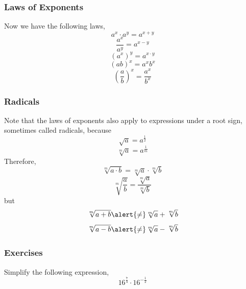 \documentclass[xcolor=dvipsnames]{beamer}
\begin{document}
\begin{frame}
  \frametitle{Laws of Exponents}
Now we have the following laws,
\begin{equation}
  \label{eq:eihietae}
  a^{x}\cdot{}a^{y}=a^{x+y}
\end{equation}
\begin{equation}
  \label{eq:eeyaidie}
  \frac{a^{x}}{a^{y}}=a^{x-y}
\end{equation}
\begin{equation}
  \label{eq:ieboonge}
  \left(a^{x}\right)^{y}=a^{x\cdot{}y}
\end{equation}
\begin{equation}
  \label{eq:oongenoh}
  (ab)^{x}=a^{x}b^{x}
\end{equation}
\begin{equation}
  \label{eq:rahsieti}
  \left(\frac{a}{b}\right)^{x}=\frac{a^{x}}{b^{x}}
\end{equation}
\end{frame}

\begin{frame}
  \frametitle{Radicals}
  Note that the laws of exponents also apply to expressions under a
  root sign, sometimes called \alert{radicals}, because
  \begin{equation}
    \label{eq:shoaphoo}
    \sqrt{a}=a^{\frac{1}{2}}
  \end{equation}
  \begin{equation}
    \label{eq:thishoof}
    \sqrt[m]{a}=a^{\frac{1}{m}}
  \end{equation}
  Therefore,
  \begin{equation}
    \label{eq:oisheidu}
    \sqrt[m]{a\cdot{}b}=\sqrt[m]{a}\cdot\sqrt[m]{b}
  \end{equation}
  \begin{equation}
    \label{eq:xahpiesh}
    \sqrt[m]{\frac{a}{b}}=\frac{\sqrt[m]{a}}{\sqrt[m]{b}}
  \end{equation}
  but
  \begin{equation}
    \label{eq:ucaithoh}
    \sqrt[m]{a+b}\alert{\neq}\sqrt[m]{a}+\sqrt[m]{b}
  \end{equation}
  \begin{equation}
    \label{eq:quohseiy}
    \sqrt[m]{a-b}\alert{\neq}\sqrt[m]{a}-\sqrt[m]{b}
  \end{equation}
\end{frame}

\begin{frame}
  \frametitle{Exercises}
{\ubung} Simplify the following expression,
\begin{equation}
  \label{eq:ohahgaoy}
  16^{\frac{7}{4}}\cdot{}16^{-\frac{1}{2}}
\end{equation}
\end{frame}
\end{document}
